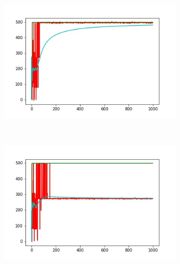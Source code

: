 \begin{figure} 
    \centering
    \begin{subfigure}[b]{0.38\textwidth}
        \includegraphics[width=\textwidth]{grafi1.jpg}
        \label{fig:gull}
    \end{subfigure}
    \vspace{0.5 mm}
    ~ %
    \begin{subfigure}[b]{0.38\textwidth}
        \includegraphics[width=\textwidth]{grafi2.jpg}
        \label{fig:tiger}
    \end{subfigure}
    ~ %
    \begin{subfigure}[b]{0.38\textwidth}

\end{subfigure}
\end{figure}
